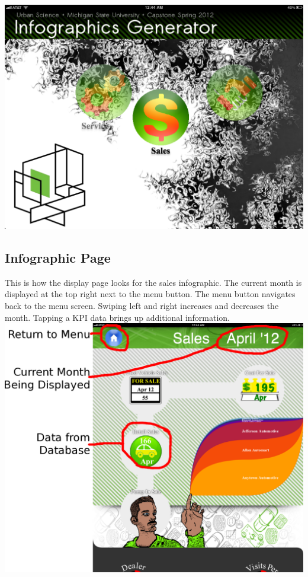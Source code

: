 \documentclass[11pt,a4paper,oneside]{article}
\begin{document}
\includegraphics[width=1\textwidth]{images/main-menu.png}\\

\subsection{Infographic Page}

This is how the display page looks for the sales infographic.  The current month is displayed at the top right next to the menu button.  The menu button navigates back to the menu screen.  Swiping left and right increases and decreases the month.  Tapping a KPI data brings up additional information.\\

\includegraphics[width=1\textwidth]{images/labels.png}\\
\end{document}
